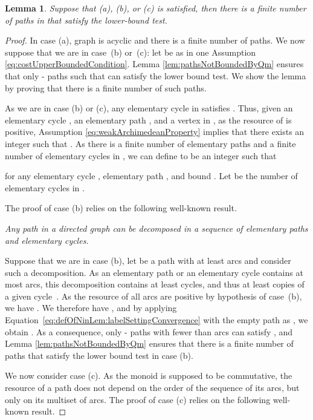 \documentclass[11pt]{amsart}
\theoremstyle{plain}
\newtheorem{lem}[theo]{Lemma}
\theoremstyle{remark}
\begin{document}
\begin{lem}\label{lem:labelSettingConvergence}
Suppose that \emph{(a)}, \emph{(b)}, or \emph{(c)} is satisfied, then there is a finite number of paths in  that satisfy the lower-bound test.
\end{lem}
\begin{proof}
In case (a), graph  is acyclic and there is a finite number of paths. We now suppose that we are in case~(b) or~(c): let  be as in one Assumption \eqref{eq:costUpperBoundedCondition}. Lemma \ref{lem:pathsNotBoundedByQm} ensures that only - paths  such that  can satisfy the lower bound test. We show the lemma by proving that there is a finite number of such paths.
 
As we are in case (b) or (c), any elementary cycle  in  satisfies . Thus, given an elementary cycle , an elementary path , and a vertex  in , as the resource of  is positive, Assumption \eqref{eq:weakArchimedeanProperty} implies that there exists an integer  such that . As there is a finite number of elementary paths and a finite number of elementary cycles in , we can define  to be an integer such that

for any elementary cycle , elementary path , and bound . Let  be the number of elementary cycles in .


The proof of case (b) relies on the following well-known result. 

{\em Any path in a directed graph can be decomposed in a sequence of elementary paths and elementary cycles.}

Suppose that we are in case (b), let  be a path with at least  arcs and consider such a decomposition. As an elementary path or an elementary cycle contains at most  arcs, this decomposition contains at least  cycles, and thus at least  copies of a given cycle~. As the resource of all arcs are positive by hypothesis of case~(b), we have . We therefore have , and by applying Equation~\eqref{eq:defOfNinLem:labelSettingConvergence} with the empty path as , we obtain . As a consequence, only - paths  with fewer than  arcs can satisfy , and Lemma \ref{lem:pathsNotBoundedByQm} ensures that there is a finite number of paths that satisfy the lower bound test in case (b). 
 
We now consider case (c). As the monoid is supposed to be commutative, the resource of a path does not depend on the order of the sequence of its arcs, but only on its multiset of arcs. The proof of case (c) relies on the following well-known result. 


\end{proof}
\end{document}
